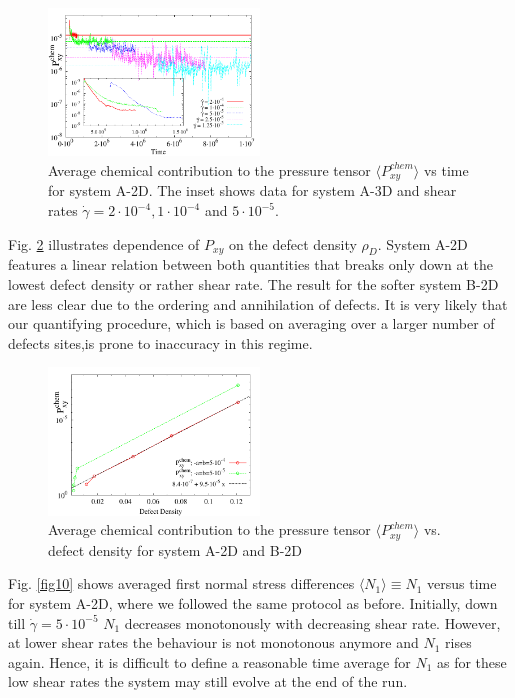 \documentclass[8.5pt,twoside,twocolumn]{article}
\newcommand{\e}[1]{\cdot10^{#1}}
\newcommand{\gd}{\dot{\gamma}}
\begin{document}
\begin{figure}[htp!]
\centering
\includegraphics[angle=0,width=0.5\textwidth]{P_xy_chem_t_5e-4.pdf}
\caption{Average chemical contribution to the pressure tensor $\langle P_{xy}^{chem}\rangle$ vs time for system A-2D. The inset shows data for system A-3D and shear rates $\dot{\gamma}=2\cdot10^{-4}, 1\cdot10^{-4}$ and $5\cdot10^{-5}$.}
\label{fig8}
\end{figure}

Fig. \ref{fig9} illustrates dependence of $P_{xy}$ on the defect density $\rho_D$.
System A-2D features a linear relation between both quantities that breaks only down at the lowest defect density or rather shear rate.
The result for the softer system B-2D are less clear due to the ordering and annihilation of defects.
It is very likely that our quantifying procedure, which is based on averaging over a larger number of defects sites,is prone to inaccuracy in this regime.

\begin{figure}[htp!]
\centering
\includegraphics[angle=0,width=0.5\textwidth]{P_xy_defect_density.pdf}
\caption{Average chemical contribution to the pressure tensor $\langle P_{xy}^{chem}\rangle$ vs. defect density for system A-2D and B-2D } 
\label{fig9}
\end{figure}

Fig. \ref{fig10} shows averaged first normal stress differences $\langle N_1\rangle \equiv N_1$ versus time for system A-2D, where we followed the same protocol as before.
Initially, down till $\gd=5\e{-5}$ $N_1$ decreases monotonously with decreasing shear rate.
However, at lower shear rates the behaviour is not monotonous anymore and $N_1$ rises again.
Hence, it is difficult to define a reasonable time average for $N_1$ as for these low shear rates the system may still evolve at the end of the run.
\end{document}
